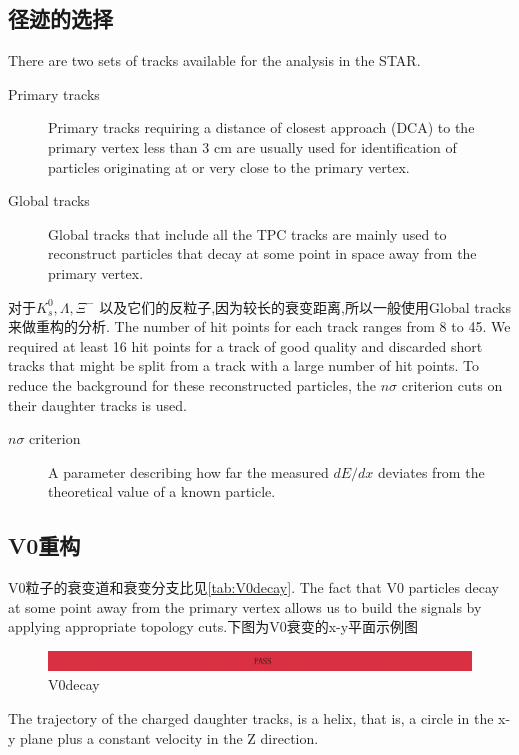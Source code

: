 \subsection{径迹的选择}
There are two sets of tracks available for the analysis in the STAR.
\begin{description}
\item[Primary tracks] {Primary tracks requiring a distance of closest approach (DCA) to the primary vertex less than 3 cm {\color{red} are usually used for identification of particles originating at or very close to the primary vertex.}}
\item[Global tracks] {Global tracks that include all the TPC tracks {\color{red}are mainly used to reconstruct particles that decay at some point in space away from the primary vertex.}}
\end{description}
对于$K^{0}_{s}, \Lambda, \Xi^{-}$ 以及它们的反粒子,因为较长的衰变距离,所以一般使用Global tracks来做重构的分析.
The number of hit points for each track ranges from 8 to 45.
We required at least 16 hit points for a track of good quality and discarded short tracks that might be split from a track with a large number of hit points.
To reduce the background for these reconstructed particles, the $n\sigma$ criterion cuts on their daughter tracks is used.
\begin{description}
\item[$n\sigma$ criterion] A parameter describing how far the measured $dE/dx$ deviates from the theoretical value of a known particle.
\end{description}

\subsection{V0重构}
V0粒子的衰变道和衰变分支比见\ref{tab:V0decay}.
The fact that V0 particles decay at some point away from the primary vertex allows us to build the signals by applying appropriate topology cuts.下图为V0衰变的x-y平面示例图
\begin{figure}[htbp]
  \centering
  \includegraphics[width=\linewidth]{pictures/pass.pdf}
  \caption{V0decay}
  \label{fig:V0decay}
\end{figure}
The trajectory of the charged daughter tracks, is a helix, that is, a circle in the x-y plane  plus a constant velocity in the Z direction.

